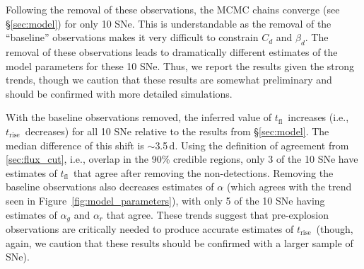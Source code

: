 \documentclass[twocolumn]{./aastex63}
\newcommand{\tfl}{$t_\mathrm{fl}$}
\newcommand{\trise}{$t_\mathrm{rise}$}
\begin{document}
Following the removal of these observations, the MCMC chains converge (see
\S\ref{sec:model}) for only 10 SNe. This is understandable as the removal of
the ``baseline'' observations makes it very difficult to constrain $C_d$ and
$\beta_d$. The removal of these observations leads to dramatically different
estimates of the model parameters for these 10 SNe. Thus, we report the
results given the strong trends, though we caution that these results are
somewhat preliminary and should be confirmed with more detailed simulations.

With the baseline observations removed, the inferred value of \tfl\ increases
(i.e., \trise\ decreases) for all 10 SNe relative to the results from
\S\ref{sec:model}. The median difference of this shift is $\sim$3.5\,d. Using
the definition of agreement from \ref{sec:flux_cut}, i.e., overlap in the 90\%
credible regions, only 3 of the 10 SNe have estimates of \tfl\ that agree
after removing the non-detections. Removing the baseline observations also
decreases estimates of $\alpha$ (which agrees with the trend seen in
Figure~\ref{fig:model_parameters}), with only 5 of the 10 SNe having estimates
of $\alpha_g$ and $\alpha_r$ that agree. These trends suggest that
pre-explosion observations are critically needed to produce accurate estimates
of \trise\ (though, again, we caution that these results should be confirmed
with a larger sample of SNe).





\end{document}
